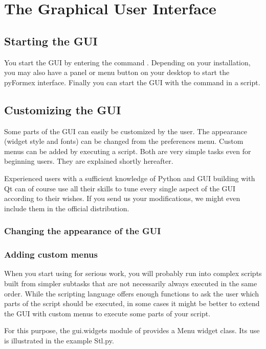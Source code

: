 
\chapter{The Graphical User Interface}
\label{cha:gui}

\section{Starting the GUI}
You start the \pyf GUI by entering the command . Depending on your installation, you may also have a panel or menu button on your desktop to start the pyFormex interface. Finally you can start the GUI with the command  in a \pyf script.



\section{Customizing the GUI}
\label{sec:customize-gui}

Some parts of the \pyformex GUI can easily be customized by the user. 
The appearance (widget style and fonts) can be changed from the preferences menu. Custom menus can be added by executing a script. Both are very simple tasks even for beginning users. They are explained shortly hereafter.

Experienced users with a sufficient knowledge of Python and GUI building with Qt can of course use all their skills to tune every single aspect of the \pyformex GUI according to their wishes. If you send us your modifications, we might even include them in the official distribution.


\subsection{Changing the appearance of the GUI}
\label{sec:chang-appe-gui}


\subsection{Adding custom menus}
\label{sec:adding-custom-menus}

When you start using \pyformex for serious work, you will probably run into complex scripts built from simpler subtasks that are not necessarily always executed in the same order. While the \pyformex scripting language offers enough functions to ask the user which parts of the script should be executed, in some cases it might be better to extend the \pyformex GUI with custom menus to execute some parts of your script.

For this purpose, the gui.widgets module of \pyformex provides a Menu widget class. Its use is illustrated in the example Stl.py.

